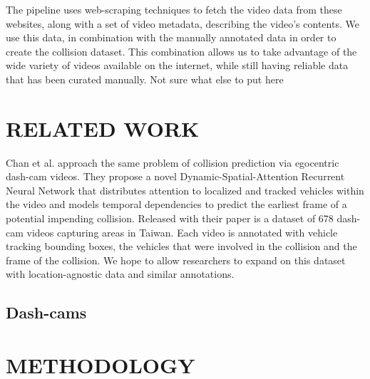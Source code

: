 \documentclass[letterpaper, 10 pt, conference]{IEEEconf}
\newcommand{\todo}[1]{{\color{red}#1}}
\begin{document}
The pipeline uses web-scraping techniques to fetch the video data from these websites, along with a set of video metadata, describing the video's contents.
We use this data, in combination with the manually annotated data in order to create the collision dataset.
This combination allows us to take advantage of the wide variety of videos available on the internet, while still having reliable data that has been curated manually.
\todo{Not sure what else to put here}



\section{RELATED WORK}

Chan et al. \cite{chan2016anticipating} approach the same problem of collision prediction via egocentric dash-cam videos. They propose a novel Dynamic-Spatial-Attention Recurrent Neural Network that distributes attention to localized and tracked vehicles within the video and models temporal dependencies to predict the earliest frame of a potential impending collision. Released with their paper is a dataset of 678 dash-cam videos capturing areas in Taiwan. Each video is annotated with vehicle tracking bounding boxes, the vehicles that were involved in the collision and the frame of the collision. We hope to allow researchers to expand on this dataset with location-agnostic data and similar annotations.



\subsection{Dash-cams}%
\label{sub:dash_cams}







\section{METHODOLOGY}
\end{document}
